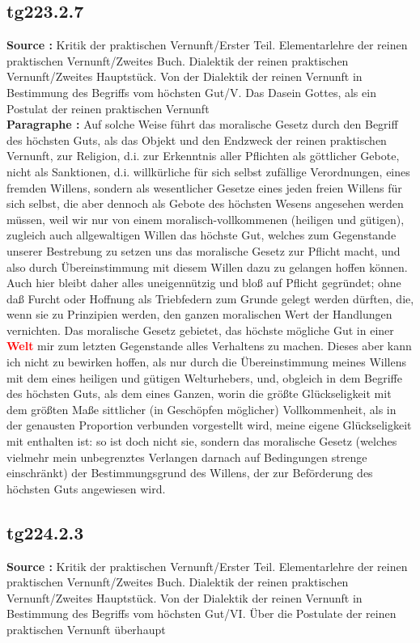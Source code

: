 \documentclass[a4paper,12pt,twoside]{book}
\newcommand{\match}[1]{\textcolor{red}{\textbf{#1}}}
\begin{document}
	\subsection*{tg223.2.7} 
	\textbf{Source : }Kritik der praktischen Vernunft/Erster Teil. Elementarlehre der reinen praktischen Vernunft/Zweites Buch. Dialektik der reinen praktischen Vernunft/Zweites Hauptstück. Von der Dialektik der reinen Vernunft in Bestimmung des Begriffs vom höchsten Gut/V. Das Dasein Gottes, als ein Postulat der reinen praktischen Vernunft\\  
	
	\noindent\textbf{Paragraphe : }
	Auf solche Weise führt das moralische Gesetz durch den Begriff des höchsten Guts, als das Objekt und den Endzweck der reinen praktischen Vernunft, zur Religion, d.i. zur Erkenntnis aller Pflichten als göttlicher Gebote, nicht als Sanktionen, d.i. willkürliche für sich selbst zufällige Verordnungen, eines fremden Willens, sondern als wesentlicher Gesetze eines jeden freien Willens für sich selbst, die aber dennoch als Gebote des höchsten Wesens angesehen werden müssen, weil wir nur von einem moralisch-vollkommenen (heiligen und gütigen), zugleich auch allgewaltigen Willen das höchste Gut, welches zum Gegenstande unserer Bestrebung zu setzen uns das moralische Gesetz zur Pflicht macht, und also durch Übereinstimmung mit diesem Willen dazu zu gelangen hoffen können. Auch hier bleibt daher alles uneigennützig und bloß auf Pflicht gegründet; ohne daß Furcht oder Hoffnung als Triebfedern zum Grunde gelegt werden dürften, die, wenn sie zu Prinzipien werden, den ganzen moralischen Wert der Handlungen vernichten. Das moralische Gesetz gebietet, das höchste mögliche Gut in einer \match{Welt} mir zum letzten Gegenstande alles Verhaltens zu machen. Dieses aber kann ich nicht zu bewirken hoffen, als nur durch die Übereinstimmung meines Willens mit dem eines heiligen und gütigen Welturhebers, und, obgleich in dem Begriffe des höchsten Guts, als dem eines Ganzen, worin die größte Glückseligkeit mit dem größten Maße sittlicher (in Geschöpfen möglicher) Vollkommenheit, als in der genausten Proportion verbunden vorgestellt wird, meine eigene Glückseligkeit mit enthalten ist: so ist doch nicht sie, sondern das moralische Gesetz (welches vielmehr mein unbegrenztes Verlangen darnach auf Bedingungen strenge einschränkt) der Bestimmungsgrund des Willens, der zur Beförderung des höchsten Guts angewiesen wird. 
	
	\subsection*{tg224.2.3} 
	\textbf{Source : }Kritik der praktischen Vernunft/Erster Teil. Elementarlehre der reinen praktischen Vernunft/Zweites Buch. Dialektik der reinen praktischen Vernunft/Zweites Hauptstück. Von der Dialektik der reinen Vernunft in Bestimmung des Begriffs vom höchsten Gut/VI. Über die Postulate der reinen praktischen Vernunft überhaupt\\  
	
\end{document}
